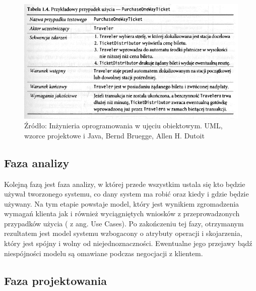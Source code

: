 \documentclass[oneside,polski,logo]{amuthesis}
\begin{document}
\begin{figure}[h]
	\centering
	\includegraphics[width=14cm]{images/hyps/use-case.png}
	\caption{Źródło:  Inżynieria oprogramowania w ujęciu obiektowym. UML, wzorce projektowe i Java, Bernd Bruegge, Allen H. Dutoit}
\end{figure}

\subsection {Faza analizy}

Kolejną fazą jest faza analizy, w której przede wszystkim ustala się kto będzie używał tworzonego systemu, co dany system ma robić oraz kiedy i gdzie będzie używany. Na tym etapie powstaje model, który jest wynikiem zgromadzenia wymagań klienta jak i również wyciągniętych wniosków z przeprowadzonych przypadków użycia ( z ang. Use Cases). Po zakończeniu tej fazy, otrzymanym rezultatem jest model systemu wzbogacony o atrybuty operacji i skojarzenia, który jest spójny i wolny od niejednoznaczności. Ewentualne jego przejawy bądź niespójności modelu są omawiane podczas negocjacji z klientem.\\

\subsection {Faza projektowania}
\end{document}
